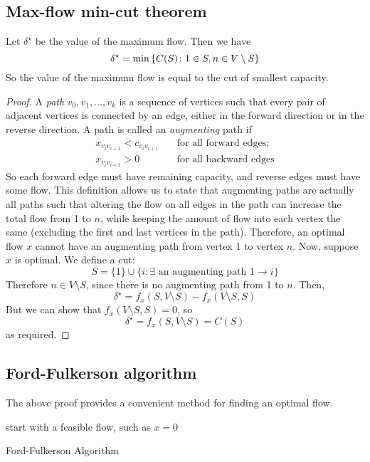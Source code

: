 \subsection{Max-flow min-cut theorem}
\begin{theorem}
	Let \( \delta^\star \) be the value of the maximum flow.
	Then we have
	\[
		\delta^\star = \min \qty{ C(S) \colon 1 \in S, n \in V \setminus S }
	\]
	So the value of the maximum flow is equal to the cut of smallest capacity.
\end{theorem}
\begin{proof}
	A \textit{path} \( v_0, v_1, \dots, v_k \) is a sequence of vertices such that every pair of adjacent vertices is connected by an edge, either in the forward direction or in the reverse direction.
	A path is called an \textit{augmenting} path if
	\begin{align*}
		x_{v_i v_{i+1}} < c_{v_i v_{i+1}} & \quad \text{for all forward edges}; \\
		x_{v_i v_{i+1}} > 0               & \quad \text{for all backward edges}
	\end{align*}
	So each forward edge must have remaining capacity, and reverse edges must have some flow.
	This definition allows us to state that augmenting paths are actually all paths such that altering the flow on all edges in the path can increase the total flow from 1 to \( n \), while keeping the amount of flow into each vertex the same (excluding the first and last vertices in the path).
	Therefore, an optimal flow \( x \) cannot have an augmenting path from vertex 1 to vertex \( n \).
	Now, suppose \( x \) is optimal.
	We define a cut:
	\[
		S = \{ 1 \} \cup \{ i \colon \exists \text{ an augmenting path } 1 \to i \}
	\]
	Therefore \( n \in V \setminus S \), since there is no augmenting path from 1 to \( n \).
	Then,
	\[
		\delta^\star = f_x(S, V \setminus S) - f_x(V \setminus S, S)
	\]
	But we can show that \( f_x(V \setminus S, S) = 0 \), so
	\[
		\delta^\star = f_x(S, V \setminus S) = C(S)
	\]
	as required.
\end{proof}

\subsection{Ford-Fulkerson algorithm}
The above proof provides a convenient method for finding an optimal flow.

\begin{algorithm*}[H]
	\SetAlgoLined{}
	start with a feasible flow, such as \(x = 0\)\;
	\caption{Ford-Fulkerson Algorithm}
\end{algorithm*}

